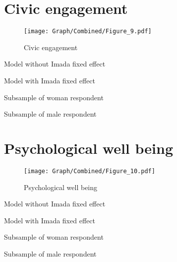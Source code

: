 \documentclass[10pt,a4paper]{article}
\begin{document}
\section{Civic engagement}
\begin{table}[H]\centering

\end{table}
\begin{figure}[H]\centering
\texttt{[image: Graph/Combined/Figure\_9.pdf]}
\caption{Civic engagement} \label{fig:Fig_9}
\end{figure}
\begin{table}[H]\centering\caption{Model without Imada fixed effect}

\end{table}
\begin{table}[H]\centering\caption{Model with Imada fixed effect}

\end{table}
\begin{table}[H]\centering\caption{Subsample of woman respondent}

\end{table}
\begin{table}[H]\centering\caption{Subsample of male respondent}

\end{table}
\pagebreak
\section{Psychological well being}
\begin{table}[H]\centering

\end{table}
\begin{figure}[H]\centering
\texttt{[image: Graph/Combined/Figure\_10.pdf]}
\caption{Psychological well being} \label{fig:Fig_10}
\end{figure}
\begin{table}[H]\centering\caption{Model without Imada fixed effect}

\end{table}
\begin{table}[H]\centering\caption{Model with Imada fixed effect}

\end{table}
\begin{table}[H]\centering\caption{Subsample of woman respondent}

\end{table}
\begin{table}[H]\centering\caption{Subsample of male respondent}

\end{table}
\pagebreak
\end{document}
